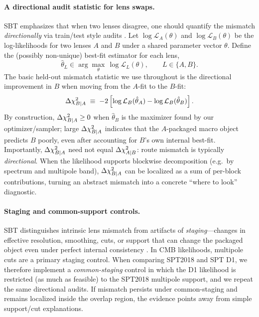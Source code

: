 \paragraph{A directional audit statistic for lens swaps.}
SBT emphasizes that when two lenses disagree, one should quantify the mismatch \emph{directionally} via train/test style audits \cite{sixbirds_darkenergy}. Let $\log \mathcal{L}_A(\theta)$ and $\log \mathcal{L}_B(\theta)$ be the log-likelihoods for two lenses $A$ and $B$ under a shared parameter vector $\theta$. Define the (possibly non-unique) best-fit estimator for each lens,
\begin{equation}
  \hat\theta_{L} \in \arg\max_{\theta}\, \log \mathcal{L}_{L}(\theta), \qquad L\in\{A,B\}.
  \label{eq:theta_hat_def}
\end{equation}
The basic held-out mismatch statistic we use throughout is the directional improvement in $B$ when moving from the $A$-fit to the $B$-fit:
\begin{equation}
  \Delta \chi^2_{B|A} \;\equiv\; -2\left[\log \mathcal{L}_B(\hat\theta_A) - \log \mathcal{L}_B(\hat\theta_B)\right].
  \label{eq:dchi_def}
\end{equation}
By construction, $\Delta \chi^2_{B|A}\ge 0$ when $\hat\theta_B$ is the maximizer found by our optimizer/sampler; large $\Delta \chi^2_{B|A}$ indicates that the $A$-packaged macro object predicts $B$ poorly, even after accounting for $B$'s own internal best-fit. Importantly, $\Delta \chi^2_{B|A}$ need not equal $\Delta \chi^2_{A|B}$: route mismatch is typically \emph{directional}. When the likelihood supports blockwise decomposition (e.g.\ by spectrum and multipole band), $\Delta \chi^2_{B|A}$ can be localized as a sum of per-block contributions, turning an abstract mismatch into a concrete ``where to look'' diagnostic.

\paragraph{Staging and common-support controls.}
SBT distinguishes intrinsic lens mismatch from artifacts of \emph{staging}---changes in effective resolution, smoothing, cuts, or support that can change the packaged object even under perfect internal consistency \cite{sixbirds_foundations}. In CMB likelihoods, multipole cuts are a primary staging control. When comparing SPT2018 and SPT D1, we therefore implement a \emph{common-staging} control in which the D1 likelihood is restricted (as much as feasible) to the SPT2018 multipole support, and we repeat the same directional audits. If mismatch persists under common-staging and remains localized inside the overlap region, the evidence points away from simple support/cut explanations.

